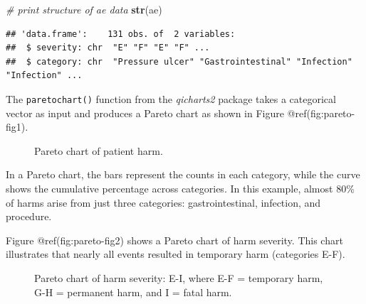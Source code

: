 \documentclass[
]{book}
\makeatletter
\newenvironment{Shaded}{\begin{snugshade}}{\end{snugshade}}
\newcommand{\CommentTok}[1]{\textcolor[rgb]{0.56,0.35,0.01}{\textit{#1}}}
\newcommand{\FunctionTok}[1]{\textcolor[rgb]{0.13,0.29,0.53}{\textbf{#1}}}
\newcommand{\NormalTok}[1]{#1}
\newcommand{\SpecialCharTok}[1]{\textcolor[rgb]{0.81,0.36,0.00}{\textbf{#1}}}
\newcommand*\pandocbounded[1]{%
  \sbox\pandoc@box{#1}%
  \Gscale@div\@tempa{\textheight}{\dimexpr\ht\pandoc@box+\dp\pandoc@box\relax}%
  \Gscale@div\@tempb{\linewidth}{\wd\pandoc@box}%
  \ifdim\@tempb\p@<\@tempa\p@\let\@tempa\@tempb\fi%
  \ifdim\@tempa\p@<\p@\scalebox{\@tempa}{\usebox\pandoc@box}%
  \else\usebox{\pandoc@box}%
  \fi%
}
\makeatother
\begin{document}
\begin{Shaded}
\begin{Highlighting}[]
\CommentTok{\# print structure of ae data}
\FunctionTok{str}\NormalTok{(ae)}
\end{Highlighting}
\end{Shaded}

\begin{verbatim}
## 'data.frame':    131 obs. of  2 variables:
##  $ severity: chr  "E" "F" "E" "F" ...
##  $ category: chr  "Pressure ulcer" "Gastrointestinal" "Infection" "Infection" ...
\end{verbatim}

The \texttt{paretochart()} function from the \emph{qicharts2} package
takes a categorical vector as input and produces a Pareto chart as shown
in Figure @ref(fig:pareto-fig1).

\begin{Shaded}
\end{Shaded}

\begin{figure}
\centering
\pandocbounded{}
\caption{Pareto chart of patient harm.}
\end{figure}

In a Pareto chart, the bars represent the counts in each category, while
the curve shows the cumulative percentage across categories. In this
example, almost 80\% of harms arise from just three categories:
gastrointestinal, infection, and procedure.

Figure @ref(fig:pareto-fig2) shows a Pareto chart of harm severity. This
chart illustrates that nearly all events resulted in temporary harm
(categories E-F).

\begin{Shaded}
\end{Shaded}

\begin{figure}
\centering
\pandocbounded{}
\caption{Pareto chart of harm severity: E-I, where E-F = temporary harm,
G-H = permanent harm, and I = fatal harm.}
\end{figure}
\end{document}
